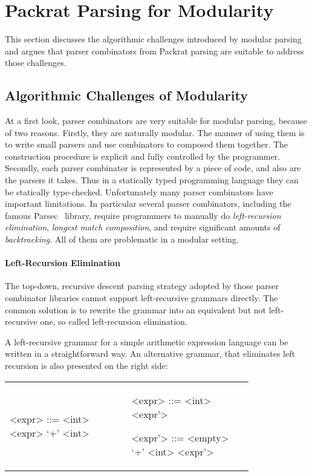 \section{Packrat Parsing for Modularity}\label{sec:packrat}

This section discusses the algorithmic challenges introduced by modular parsing and argues that parser combinators from Packrat parsing
are suitable to address those challenges.

\subsection{Algorithmic Challenges of Modularity}
At a first look, parser combinators are very suitable for modular parsing, because of two reasons. Firstly, they are naturally modular. The manner of using them is to write small parsers and use combinators to composed them together. The construction procedure is explicit and fully controlled by the programmer. Secondly, each parser combinator is represented by a piece of code, and also are the parsers it takes. Thus in a statically typed programming language they can be statically type-checked.
Unfortunately many parser combinators have important limitations.
In particular several parser combinators,
including the famous Parsec~\cite{Leijen2001} library, require
programmers to manually do \textit{left-recursion elimination}, \textit{longest match composition}, and
require significant amounts of \textit{backtracking}. All of them are
problematic in a modular setting.

\paragraph{Left-Recursion Elimination} The top-down, recursive descent parsing strategy adopted by those parser combinator libraries cannot support left-recursive grammars directly. The common solution is to rewrite the grammar into an equivalent but not left-recursive one, so called left-recursion elimination.

A left-recursive grammar for a simple arithmetic expression language can be written in a straightforward way. An alternative grammar, that eliminates left recursion is also presented on the right side:

\begin{tabular}{m{0.4\linewidth}m{0.4\linewidth}}
\setlength{\grammarindent}{5em}
\begin{grammar}
<expr> ::= <int> \alt <expr> `+' <int>
\end{grammar}
&
\setlength{\grammarindent}{5em}
\begin{grammar}
<expr> ::= <int> <expr'>

<expr'> ::= <empty> \alt `+' <int> <expr'>
\end{grammar}
\end{tabular}

